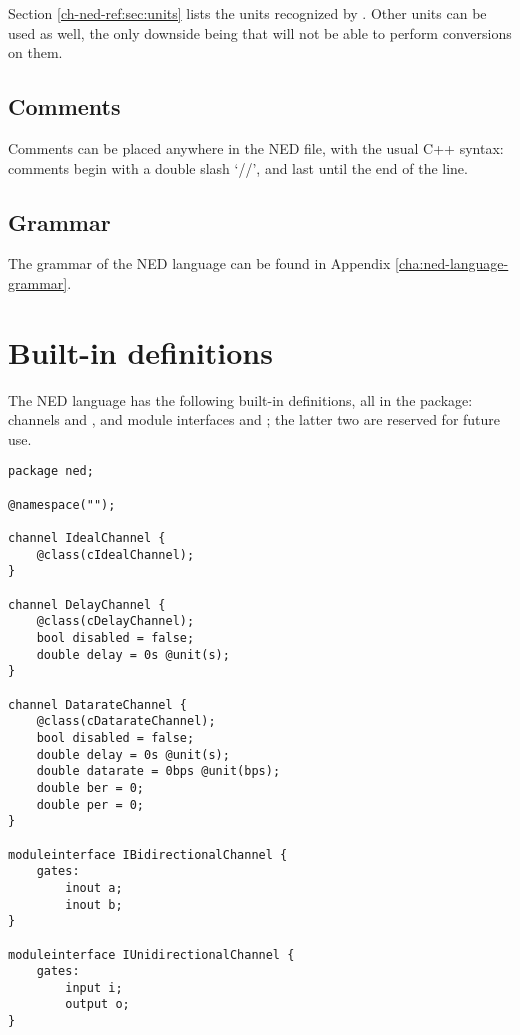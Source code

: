 Section \ref{ch-ned-ref:sec:units} lists the units recognized by \opp.
Other units can be used as well, the only downside being that \opp will not be
able to perform conversions on them.

\subsection{Comments}

Comments can be placed anywhere in the NED file, with the usual C++
syntax: comments begin with a double slash `//', and last until
the end of the line.

\subsection{Grammar}

The grammar of the NED language can be found in Appendix
\ref{cha:ned-language-grammar}.

\section{Built-in definitions}
\label{ch-ned-ref:sec:built-in-defs}

The NED language has the following built-in definitions, all in the 
package: channels  and , and module
interfaces  and ; the
latter two are reserved for future use.

\begin{verbatim}
package ned;

@namespace("");

channel IdealChannel {
    @class(cIdealChannel);
}

channel DelayChannel {
    @class(cDelayChannel);
    bool disabled = false;
    double delay = 0s @unit(s);
}

channel DatarateChannel {
    @class(cDatarateChannel);
    bool disabled = false;
    double delay = 0s @unit(s);
    double datarate = 0bps @unit(bps);
    double ber = 0;
    double per = 0;
}

moduleinterface IBidirectionalChannel {
    gates:
        inout a;
        inout b;
}

moduleinterface IUnidirectionalChannel {
    gates:
        input i;
        output o;
}
\end{verbatim}



